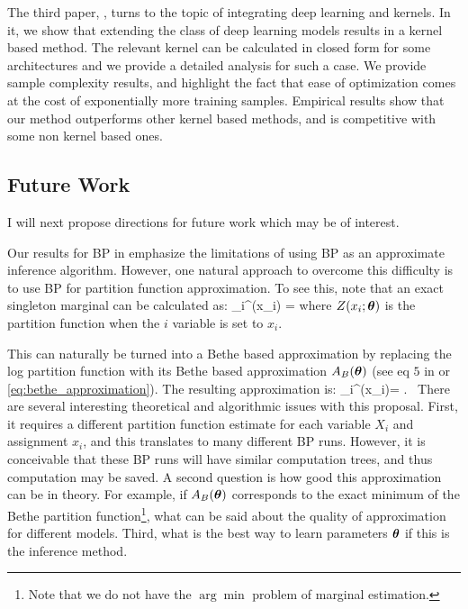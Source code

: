 The third paper, , turns to the topic of integrating deep learning and kernels.
In it, we show that extending the class of deep learning models results in a kernel based method.
The relevant kernel can be calculated in closed form for some architectures and we provide a detailed analysis for such a case.
We provide sample complexity results, and highlight the fact that ease of optimization comes at the cost of exponentially more training samples.
Empirical results show that our method outperforms other kernel based methods, and is competitive with some non kernel based ones.  


\subsection{Future Work}
I will next propose directions for future work which may be of interest.

Our results for BP in  emphasize the limitations of using BP as an approximate inference algorithm. However, one natural approach to overcome this difficulty is to use BP for partition function approximation. To see this, note that an exact singleton marginal can be calculated as:
\be
\mu_i^{\thetav}(x_i) = 
\label{eq:marg_partition}
\ee
where $Z(x_i;\boldsymbol{\theta})$ 
is the partition function when the $i$ variable is set to $x_i$.  

This can naturally be turned into a Bethe based approximation by replacing the log partition function with its Bethe based approximation $A_B(\boldsymbol{\theta})$ (see eq $5$ in  or \eqref{eq:bethe_approximation}). The resulting approximation is:
\be
\tau_i^{\thetav}(x_i)=  .~
\ee
There are several interesting theoretical and algorithmic issues with this proposal. First, it requires a different partition function estimate for each variable $X_i$ and assignment $x_i$, and this translates to many different BP runs. However, it is conceivable that these BP runs will have similar computation trees, and thus computation may be saved. A second question is how good this approximation can be in theory. For example, if $A_B(\boldsymbol{\theta})$ corresponds to the exact minimum of the Bethe partition function\footnote{Note that we do not have the $\arg\min$ problem of marginal estimation.}, what can be said about the quality of approximation for different models. Third, what is the best way to learn parameters $\boldsymbol{\theta}$ if this is the inference method.

